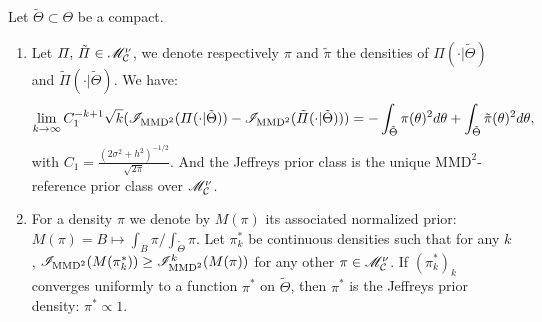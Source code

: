     \begin{prop}
        Let $\tilde\Theta\subset\Theta$ be a compact. 
        \begin{enumerate}
            \item Let $\varPi,\,\tilde\varPi\in\mathscr{M}^\nu_{\mathcal{C}}$, we denote respectively $\pi$ and $\tilde\pi$ the densities of $\varPi(\cdot|\tilde\Theta)$ and $\tilde\varPi(\cdot|\tilde\Theta)$. We have:
            \begin{equation}
                \lim_{k\rightarrow\infty} C_1^{-k+1}\sqrt{k}(\mathscr{I}_{\text{MMD}^2}(\varPi(\cdot|\tilde\Theta))-\mathscr{I}_{\text{MMD}^2}(\tilde\varPi(\cdot|\tilde\Theta)) ) = -\int_{\tilde\Theta}\pi(\theta)^2d\theta + \int_{\tilde\Theta}\tilde\pi(\theta)^2d\theta,
            \end{equation}
            with $C_1=\frac{(2\sigma^2+h^2)^{-1/2}}{\sqrt{2\pi}}$.
            And the Jeffreys prior class is the unique $\text{MMD}^2$-reference prior class over $\mathscr{M}^\nu_{\mathcal{C}}$.
            \item For a density $\pi$ %
            we denote by $M(\pi)$ its associated normalized prior: $M(\pi)=B\mapsto\int_B\pi/\int_{\tilde\Theta}\pi$.
            Let $\pi^\ast_k$ be continuous densities such that for any $k$, $\mathscr{I}_{\text{MMD}^2}(M(\pi^\ast_k))\geq \mathscr{I}^k_{\text{MMD}^2}(M(\pi))$ for any other  $\pi\in\mathscr{M}^\nu_{\mathcal{C}}$.
            If $(\pi^\ast_k)_k$ converges uniformly to a function $\pi^\ast$ on $\tilde\Theta$, then $\pi^\ast$ is the Jeffreys prior density: $\pi^\ast\propto1$.
        \end{enumerate}
    \end{prop}

